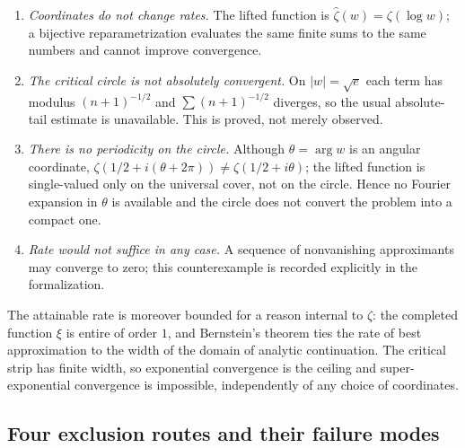 \documentclass[submission,noinfoline]{jsfds}
\newcommand{\Lean}[1]{}
\newcommand{\abs}[1]{\lvert #1\rvert}
\begin{document}
\begin{enumerate}
\item \emph{Coordinates do not change rates.} The lifted function is
$\widehat\zeta(w)=\zeta(\log w)$; a bijective reparametrization evaluates the
same finite sums to the same numbers and cannot improve convergence.
\item \emph{The critical circle is not absolutely convergent.} On
$\abs w=\sqrt e$ each term has modulus $(n+1)^{-1/2}$ and
$\sum (n+1)^{-1/2}$ diverges, so the usual absolute-tail estimate is
unavailable. This is proved, not merely observed.
\Lean{critical_lifted_terms_not_summable}
\item \emph{There is no periodicity on the circle.} Although $\theta=\arg w$
is an angular coordinate, $\zeta(1/2+i(\theta+2\pi))\neq\zeta(1/2+i\theta)$;
the lifted function is single-valued only on the universal cover, not on the
circle. Hence no Fourier expansion in $\theta$ is available and the circle
does not convert the problem into a compact one.
\item \emph{Rate would not suffice in any case.} A sequence of nonvanishing
approximants may converge to zero; this counterexample is recorded explicitly
in the formalization.
\Lean{nonzero_approximants_can_converge_to_zero}
\end{enumerate}

The attainable rate is moreover bounded for a reason internal to $\zeta$: the
completed function $\xi$ is entire of order $1$, and Bernstein's theorem ties
the rate of best approximation to the width of the domain of analytic
continuation. The critical strip has finite width, so exponential convergence
is the ceiling and super-exponential convergence is impossible, independently
of any choice of coordinates.

\subsection{Four exclusion routes and their failure modes}
\end{document}
